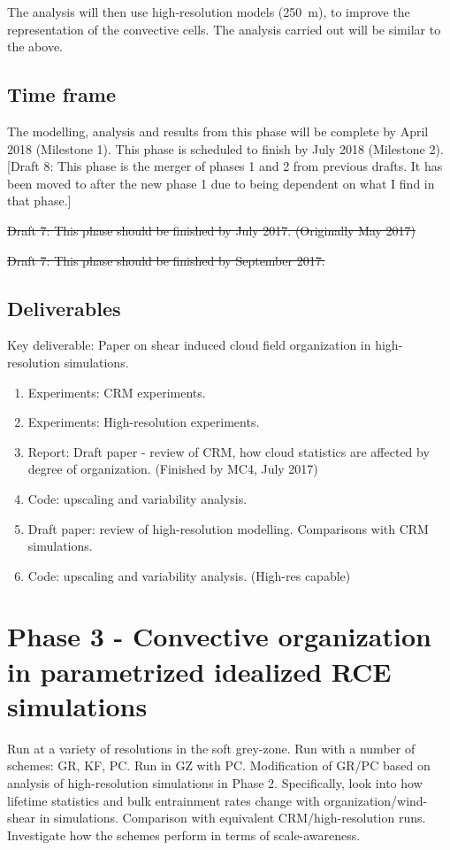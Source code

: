 \documentclass[11pt,a4paper]{article}
\begin{document}
The analysis will then use high-resolution models (\SI{250}{m}), to improve the representation of the convective cells. The analysis carried out will be similar to the above. 

\subsection*{Time frame}

The modelling, analysis and results from this phase will be complete by April 2018 (Milestone 1). This phase is scheduled to finish by July 2018 (Milestone 2). [Draft 8: This phase is the merger of phases 1 and 2 from previous drafts. It has been moved to after the new phase 1 due to being dependent on what I find in that phase.]

\sout{Draft 7: This phase should be finished by July 2017. (Originally May 2017)}

\sout{Draft 7: This phase should be finished by September 2017.}

\subsection*{Deliverables}

Key deliverable: Paper on shear induced cloud field organization in high-resolution simulations.

\begin{enumerate}
    \item Experiments: CRM experiments.
    \item Experiments: High-resolution experiments.
    \item Report: Draft paper - review of CRM, how cloud statistics are affected by degree of organization. (Finished by MC4, July 2017)
    \item Code: upscaling and variability analysis.
    \item Draft paper: review of high-resolution modelling. Comparisons with CRM simulations.
    \item Code: upscaling and variability analysis. (High-res capable)
\end{enumerate}

\section*{Phase 3 - Convective organization in parametrized idealized RCE simulations}
Run at a variety of resolutions in the soft grey-zone. Run with a number of schemes: GR, KF, PC. Run in GZ with PC. Modification of GR/PC based on analysis of high-resolution simulations in Phase 2. Specifically, look into how lifetime statistics and bulk entrainment rates change with organization/wind-shear in simulations. Comparison with equivalent CRM/high-resolution runs. Investigate how the schemes perform in terms of scale-awareness.
\end{document}
